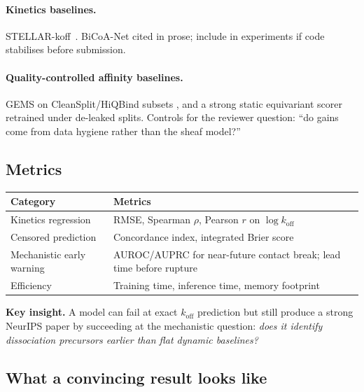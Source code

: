 \documentclass[12pt,a4paper]{article}
\begin{document}
\paragraph{Kinetics baselines.}
STELLAR-koff~\citep{stellarkoff2025}.
BiCoA-Net cited in prose; include in experiments if code stabilises
before submission.

\paragraph{Quality-controlled affinity baselines.}
GEMS on CleanSplit/HiQBind subsets \citep{cleansplit2025,hiqbind2025},
and a strong static equivariant scorer retrained under de-leaked splits.
Controls for the reviewer question: ``do gains come from data hygiene
rather than the sheaf model?''

\subsection{Metrics}

\begin{center}
\begin{tabularx}{0.85\textwidth}{lX}
\toprule
\textbf{Category} & \textbf{Metrics} \\
\midrule
Kinetics regression
  & RMSE, Spearman $\rho$, Pearson $r$ on $\log k_{\text{off}}$ \\
Censored prediction
  & Concordance index, integrated Brier score \\
Mechanistic early warning
  & AUROC/AUPRC for near-future contact break;
    lead time before rupture \\
Efficiency
  & Training time, inference time, memory footprint \\
\bottomrule
\end{tabularx}
\end{center}

\begin{resultbox}
\textbf{Key insight.}
A model can fail at exact $k_{\text{off}}$ prediction but still produce
a strong NeurIPS paper by succeeding at the mechanistic question:
\emph{does it identify dissociation precursors earlier than flat dynamic
baselines?}
\end{resultbox}

\subsection{What a convincing result looks like}
\end{document}
